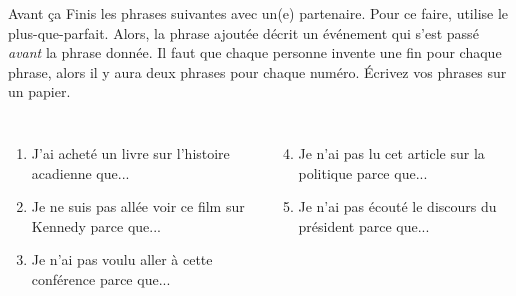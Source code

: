 \begin{frame}{Avant ça}
  Finis les phrases suivantes avec un(e) partenaire.
  Pour ce faire, \alert{utilise le plus-que-parfait}.
  Alors, la phrase ajoutée décrit un événement qui s'est passé \emph{avant} la phrase donnée.
  Il faut que chaque personne invente une fin pour chaque phrase, alors il y aura \alert{deux} phrases pour chaque numéro.
  Écrivez vos phrases sur un papier.
  \vspace{0.25cm}
  \begin{columns}[t]
      \begin{enumerate}
        \item J'ai acheté un livre sur l'histoire acadienne que...
        \item Je ne suis pas allée voir ce film sur Kennedy parce que...
        \item Je n'ai pas voulu aller à cette conférence parce que...
      \end{enumerate}
      \begin{enumerate}
        \setcounter{enumi}{3}
        \item Je n'ai pas lu cet article sur la politique parce que...
        \item Je n'ai pas écouté le discours du président parce que...
      \end{enumerate}
  \end{columns}
\end{frame}